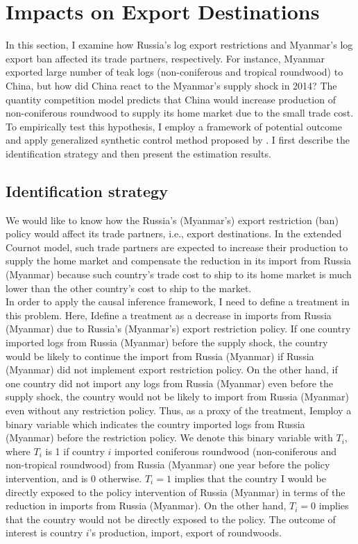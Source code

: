 \documentclass[a4paper,12pt]{article}
\begin{document}
\section{Impacts on Export Destinations}
In this section, I examine how Russia's log export restrictions and Myanmar's log export ban affected its trade partners, respectively. For instance, Myanmar exported large number of teak logs (non-coniferous and tropical roundwood) to China, but how did China react to the Myanmar's supply shock in 2014? The quantity competition model predicts that China would increase production of non-coniferous roundwood to supply its home market due to the small trade cost. To empirically test this hypothesis, I employ a framework of potential outcome and apply generalized synthetic control method proposed by \cite{xu2017generalized}. I first describe the identification strategy and then present the estimation results.

\subsection{Identification strategy}

We would like to know how the Russia's (Myanmar's) export restriction (ban) policy would affect its trade partners, i.e., export destinations. In the extended Cournot model, such trade partners are expected to increase their production to supply the home market and compensate the reduction in its import from Russia (Myanmar) because such country's trade cost to ship to its home market is much lower than the other country's cost to ship to the market. \\

In order to apply the causal inference framework, I need to define a treatment in this problem. Here, Idefine a treatment as a decrease in imports from Russia (Myanmar) due to Russia's (Myanmar's) export restriction policy. If one country imported logs from Russia (Myanmar) before the supply shock, the country would be likely to continue the import from Russia (Myanmar) if Russia (Myanmar) did not implement export restriction policy. On the other hand, if one country did not import any logs from Russia (Myanmar) even before the supply shock, the country would not be likely to import from Russia (Myanmar) even without any restriction policy. Thus, as a proxy of the treatment, Iemploy a binary variable which indicates the country imported logs from Russia (Myanmar) before the restriction policy. We denote this binary variable with $T_i$, where $T_i$ is 1 if country $i$ imported coniferous roundwood (non-coniferous and non-tropical roundwood) from Russia (Myanmar) one year before the policy intervention, and is 0 otherwise. $T_i = 1$ implies that the country I would be directly exposed to the policy intervention of Russia (Myanmar) in terms of the reduction in imports from Russia (Myanmar). On the other hand, $T_i = 0$ implies that the country would not be directly exposed to the policy. The outcome of interest is country $i$'s production, import, export of roundwoods.\\
\end{document}
